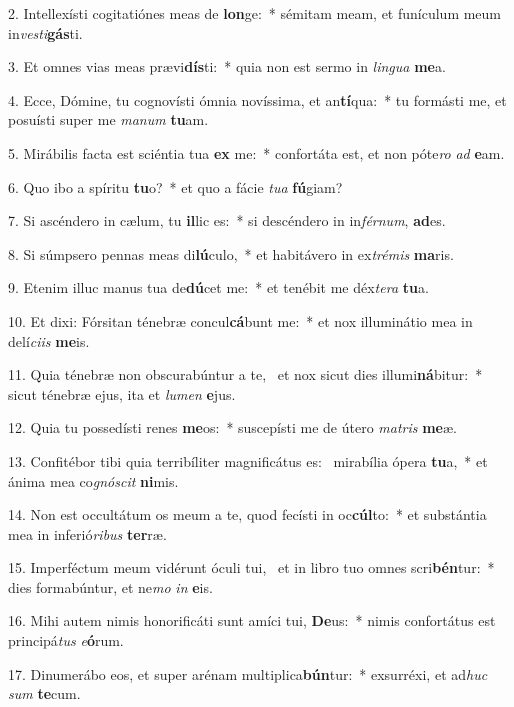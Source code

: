 2. Intellexísti cogitatiónes meas de \textbf{lon}ge:~*  sémitam meam, et funículum meum in\textit{ves}\textit{ti}\textbf{gás}ti.\

3. Et omnes vias meas prævi\textbf{dís}ti:~*  quia non est sermo in \textit{lin}\textit{gua} \textbf{me}a.\

4. Ecce, Dómine, tu cognovísti ómnia novíssima, et an\textbf{tí}qua:~*  tu formásti me, et posuísti super me \textit{ma}\textit{num} \textbf{tu}am.\

5. Mirábilis facta est sciéntia tua \textbf{ex} me:~*  confortáta est, et non póte\textit{ro} \textit{ad} \textbf{e}am.\

6. Quo ibo a spíritu \textbf{tu}o?~*  et quo a fácie \textit{tu}\textit{a} \textbf{fú}giam?\

7. Si ascéndero in cælum, tu \textbf{il}lic es:~*  si descéndero in in\textit{fér}\textit{num}, \textbf{ad}es.\

8. Si súmpsero pennas meas di\textbf{lú}culo,~*  et habitávero in ex\textit{tré}\textit{mis} \textbf{ma}ris.\

9. Etenim illuc manus tua de\textbf{dú}cet me:~*  et tenébit me déx\textit{te}\textit{ra} \textbf{tu}a.\

10. Et dixi: Fórsitan ténebræ concul\textbf{cá}bunt me:~*  et nox illuminátio mea in delí\textit{ci}\textit{is} \textbf{me}is.\

11. Quia ténebræ non obscurabúntur a te, \dag\  et nox sicut dies illumi\textbf{ná}bitur:~*  sicut ténebræ ejus, ita et \textit{lu}\textit{men} \textbf{e}jus.\

12. Quia tu possedísti renes \textbf{me}os:~*  suscepísti me de útero \textit{ma}\textit{tris} \textbf{me}æ.\

13. Confitébor tibi quia terribíliter magnificátus es: \dag\  mirabília ópera \textbf{tu}a,~*  et ánima mea co\textit{gnó}\textit{scit} \textbf{ni}mis.\

14. Non est occultátum os meum a te, quod fecísti in oc\textbf{cúl}to:~*  et substántia mea in inferió\textit{ri}\textit{bus} \textbf{ter}ræ.\

15. Imperféctum meum vidérunt óculi tui, \dag\  et in libro tuo omnes scri\textbf{bén}tur:~*  dies formabúntur, et ne\textit{mo} \textit{in} \textbf{e}is.\

16. Mihi autem nimis honorificáti sunt amíci tui, \textbf{De}us:~*  nimis confortátus est principá\textit{tus} \textit{e}\textbf{ó}rum.\

17. Dinumerábo eos, et super arénam multiplica\textbf{bún}tur:~*  exsurréxi, et ad\textit{huc} \textit{sum} \textbf{te}cum.\

